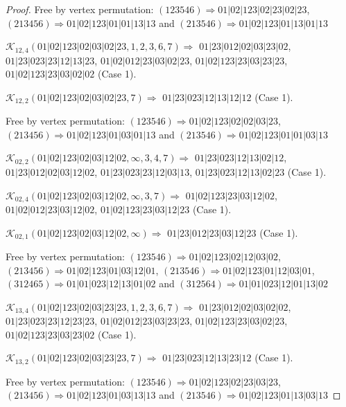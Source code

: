 \documentclass[12pt]{article}
\theoremstyle{plain}
\theoremstyle{definition}
\theoremstyle{remark}
\newcommand{\fancy}[1]{\mathcal{#1}}
\def\K{\fancy{K}}
\begin{document}
\begin{proof}
	
	
	Free by vertex permutation: $(1 2 3 5 4 6)\Rightarrow 01|02|123|02|23|02|23$, $(2 1 3 4 5 6)\Rightarrow 01|02|123|01|01|13|13$ and $(2 1 3 5 4 6)\Rightarrow 01|02|123|01|13|01|13$
	
	
	
	\bigskip
	
	$\K_{12,4}(01|02|123|02|03|02|23,1, 2, 3, 6, 7)\Rightarrow $ $01|23|012|02|03|23|02$, $01|23|023|23|12|13|23$, $01|02|012|23|03|02|23$, $01|02|123|23|03|23|23$, $01|02|123|23|03|02|02$ (Case 1).
	
	$\K_{12,2}(01|02|123|02|03|02|23,7)\Rightarrow $ $01|23|023|12|13|12|12$ (Case 1).
	
	
	
	Free by vertex permutation: $(1 2 3 5 4 6)\Rightarrow 01|02|123|02|02|03|23$, $(2 1 3 4 5 6)\Rightarrow 01|02|123|01|03|01|13$ and $(2 1 3 5 4 6)\Rightarrow 01|02|123|01|01|03|13$
	
	
	
	\bigskip
	
	$\K_{02,2}(01|02|123|02|03|12|02,\infty,3, 4, 7)\Rightarrow $ $01|23|023|12|13|02|12$, $01|23|012|02|03|12|02$, $01|23|023|23|12|03|13$, $01|23|023|12|13|02|23$ (Case 1).
	
	$\K_{02,4}(01|02|123|02|03|12|02,\infty,3, 7)\Rightarrow $ $01|02|123|23|03|12|02$, $01|02|012|23|03|12|02$, $01|02|123|23|03|12|23$ (Case 1).
	
	$\K_{02,1}(01|02|123|02|03|12|02,\infty)\Rightarrow $ $01|23|012|23|03|12|23$ (Case 1).
	
	
	
	Free by vertex permutation: $(1 2 3 5 4 6)\Rightarrow 01|02|123|02|12|03|02$, $(2 1 3 4 5 6)\Rightarrow 01|02|123|01|03|12|01$, $(2 1 3 5 4 6)\Rightarrow 01|02|123|01|12|03|01$, $(3 1 2 4 6 5)\Rightarrow 01|01|023|12|13|01|02$ and $(3 1 2 5 6 4)\Rightarrow 01|01|023|12|01|13|02$
	
	
	
	\bigskip
	
	$\K_{13,4}(01|02|123|02|03|23|23,1, 2, 3, 6, 7)\Rightarrow $ $01|23|012|02|03|02|02$, $01|23|023|23|12|23|23$, $01|02|012|23|03|23|23$, $01|02|123|23|03|02|23$, $01|02|123|23|03|23|02$ (Case 1).
	
	$\K_{13,2}(01|02|123|02|03|23|23,7)\Rightarrow $ $01|23|023|12|13|23|12$ (Case 1).
	
	
	
	Free by vertex permutation: $(1 2 3 5 4 6)\Rightarrow 01|02|123|02|23|03|23$, $(2 1 3 4 5 6)\Rightarrow 01|02|123|01|03|13|13$ and $(2 1 3 5 4 6)\Rightarrow 01|02|123|01|13|03|13$
	

\end{proof}
\end{document}
